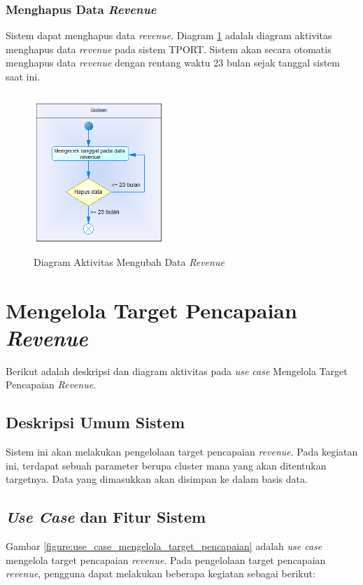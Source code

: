 \subsubsection{Menghapus Data \textit{Revenue}}
Sistem dapat menghapus data \textit{revenue}. Diagram \ref{figure:activity_menghapus_data_revenue} adalah diagram aktivitas menghapus data \textit{revenue} pada sistem TPORT. Sistem akan secara otomatis menghapus data \textit{revenue} dengan rentang waktu 23 bulan sejak tanggal sistem saat ini. 
	
	\begin{figure}[h]
		\centerline {\includegraphics[width=5cm,height=6cm]{bab4/activity_menghapus_data_revenue.png}}
		\caption{Diagram Aktivitas Mengubah Data \textit{Revenue}}
		\label{figure:activity_menghapus_data_revenue}
	\end{figure}
	
\section{Mengelola Target Pencapaian \textit{Revenue}}
Berikut adalah deskripsi dan diagram aktivitas pada \textit{use case} Mengelola Target Pencapaian \textit{Revenue}.

\subsection{Deskripsi Umum Sistem}
\tab Sistem ini akan melakukan pengelolaan target pencapaian \textit{revenue}. Pada kegiatan ini, terdapat sebuah parameter berupa cluster mana yang akan ditentukan targetnya. Data yang dimasukkan akan disimpan ke dalam basis data.

\subsection{\textit{Use Case} dan Fitur Sistem}
Gambar \ref{figure:use_case_mengelola_target_pencapaian} adalah \textit{use case} mengelola target pencapaian \textit{revenue}. Pada pengelolaan target pencapaian \textit{revenue}, pengguna dapat melakukan beberapa kegiatan sebagai berikut:

